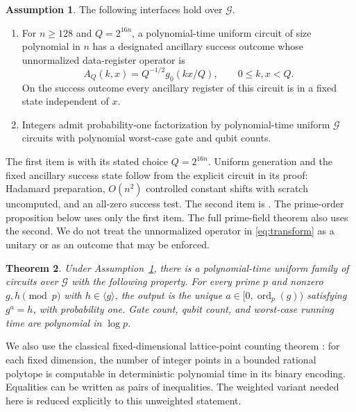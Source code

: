 \documentclass[11pt,reqno]{amsart}
\numberwithin{equation}{section}
\newtheorem{theorem}{Theorem}[section]
\theoremstyle{definition}
\newtheorem{assumption}[theorem]{Assumption}
\theoremstyle{remark}
\DeclareMathOperator{\ord}{ord}
\begin{document}
\begin{assumption}\label{ass:source}
The following interfaces hold over $\mathcal G$.
\begin{enumerate}
\item For $n\ge128$ and $Q=2^{16n}$, a polynomial-time uniform circuit of size polynomial
in $n$ has a designated ancillary success outcome whose unnormalized
data-register operator is
\begin{equation}\label{eq:transform}
 A_Q(k,x)=Q^{-1/2}g_0(kx/Q),\qquad 0\le k,x<Q.
\end{equation}
On the success outcome every ancillary register of this circuit is in a
fixed state independent of $x$.
\item Integers admit probability-one factorization by polynomial-time uniform
$\mathcal G$ circuits with polynomial worst-case gate and qubit counts.
\end{enumerate}
\end{assumption}
The first item is \cite[Lemma 3.2]{OpenAI} with its stated choice
$Q=2^{16n}$. Uniform generation and the fixed ancillary success state
follow from the explicit circuit in its proof: Hadamard preparation,
$O(n^2)$ controlled constant shifts with scratch uncomputed, and an
all-zero success test. The second item is \cite[Theorem 1.1]{OpenAI}. The prime-order proposition below uses only
the first item. The full prime-field theorem also uses the second.
We do not treat the unnormalized operator in \eqref{eq:transform} as a
unitary or as an outcome that may be enforced.

\begin{theorem}\label{thm:main}
Under Assumption~\ref{ass:source}, there is a polynomial-time uniform
family of circuits over $\mathcal G$ with the following property.
For every prime $p$ and nonzero $g,h\pmod p$ with
$h\in\langle g\rangle$, the output is the unique
$a\in[0,\ord_p(g))$ satisfying $g^a=h$, with probability one.
Gate count, qubit count, and worst-case running time are polynomial
in $\log p$.
\end{theorem}

We also use the classical fixed-dimensional lattice-point counting
theorem \cite[Theorem 4.4 and Algorithm 5.2]{BP}: for each fixed
dimension, the number of integer points in a bounded rational polytope
is computable in deterministic polynomial time in its binary encoding.
Equalities can be written as pairs of inequalities. The weighted
variant needed here is reduced explicitly to this unweighted statement.
\end{document}
